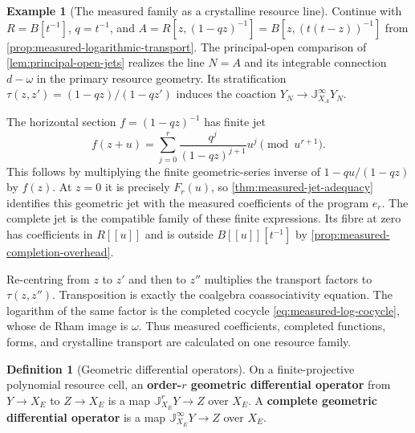\documentclass[11pt,a4paper]{article}
\numberwithin{algorithm}{section}
\numberwithin{equation}{section}
\theoremstyle{definition}
\newtheorem{definition}[definition]{Definition}
\newtheorem{example}[example]{Example}
\theoremstyle{remark}
\theoremstyle{plain}
\theoremstyle{definition}
\theoremstyle{plain}
\begin{document}
\begin{example}[The measured family as a crystalline resource line]
\label{ex:measured-crystalline-family}
Continue with $R=B[t^{-1}]$, $q=t^{-1}$, and
$A=R[z,(1-qz)^{-1}]=B[z,(t(t-z))^{-1}]$ from
\cref{prop:measured-logarithmic-transport}.
The principal-open comparison of \cref{lem:principal-open-jets}
realizes the line $N=A$ and its integrable connection $d-\omega$ in
the primary resource geometry. Its stratification
$\tau(z,z')=(1-qz)/(1-qz')$ induces the coaction
$Y_N\to\mathbb J_{X_A}^{\infty}Y_N$.

The horizontal section $f=(1-qz)^{-1}$ has finite jet
\begin{equation}\label{eq:measured-crystalline-taylor}
 f(z+u)=\sum_{j=0}^r\frac{q^j}{(1-qz)^{j+1}}u^j
 \pmod{u^{r+1}}.
\end{equation}
This follows by multiplying the finite geometric-series inverse of
$1-qu/(1-qz)$ by $f(z)$. At $z=0$ it is precisely $F_r(u)$,
so \cref{thm:measured-jet-adequacy} identifies this geometric jet
with the measured coefficients of the program $e_r$.
The complete jet is the compatible family of these finite expressions.
Its fibre at zero has coefficients in $R[[u]]$ and is outside
$B[[u]][t^{-1}]$ by \cref{prop:measured-completion-overhead}.

Re-centring from $z$ to $z'$ and then to $z''$ multiplies the
transport factors to $\tau(z,z'')$. Transposition is exactly the
coalgebra coassociativity equation. The logarithm of the same factor
is the completed cocycle \eqref{eq:measured-log-cocycle}, whose de Rham
image is $\omega$. Thus measured coefficients, completed functions,
forms, and crystalline transport are calculated on one resource family.
\end{example}


\begin{definition}[Geometric differential operators]\label{def:geometric-operators}
On a finite-projective polynomial resource cell, an
\textbf{order-$r$ geometric differential operator} from $Y\to X_E$
to $Z\to X_E$ is a map $\mathbb J_{X_E}^rY\to Z$ over $X_E$.
A \textbf{complete geometric differential operator} is a map
$\mathbb J_{X_E}^\infty Y\to Z$ over $X_E$.
\end{definition}
\end{document}
